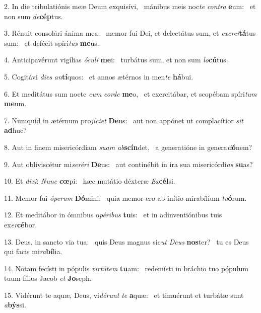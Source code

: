 2. In die tribulatiónis meæ Deum exquisívi, \dag\  mánibus meis noc\textit{te} \textit{con}\textit{tra} \textbf{e}um: \ast\  et non sum \textit{de}\textbf{cép}tus.\

3. Rénuit consolári ánima mea: \dag\  memor fui Dei, et delectátus sum, et \textit{ex}\textit{er}\textit{ci}\textbf{tá}tus sum: \ast\  et defécit spíri\textit{tus} \textbf{me}us.\

4. Anticipavérunt vigílias \textit{ó}\textit{cu}\textit{li} \textbf{me}i: \ast\  turbátus sum, et non sum \textit{lo}\textbf{cú}tus.\

5. Cogitávi \textit{di}\textit{es} \textit{an}\textbf{tí}quos: \ast\  et annos ætérnos in men\textit{te} \textbf{há}bui.\

6. Et meditátus sum nocte \textit{cum} \textit{cor}\textit{de} \textbf{me}o, \ast\  et exercitábar, et scopébam spíri\textit{tum} \textbf{me}um.\

7. Numquid in ætérnum pro\textit{jí}\textit{ci}\textit{et} \textbf{De}us: \ast\  aut non appónet ut complacítior \textit{sit} \textbf{ad}huc?\

8. Aut in finem misericórdiam \textit{su}\textit{am} \textit{ab}\textbf{scín}det, \ast\  a generatióne in genera\textit{ti}\textbf{ó}nem?\

9. Aut obliviscétur mi\textit{se}\textit{ré}\textit{ri} \textbf{De}us: \ast\  aut continébit in ira sua misericórdi\textit{as} \textbf{su}as?\

10. Et \textit{di}\textit{xi}: \textit{Nunc} \textbf{cœ}pi: \ast\  hæc mutátio déxteræ \textit{Ex}\textbf{cél}si.\

11. Memor fui \textit{ó}\textit{pe}\textit{rum} \textbf{Dó}mini: \ast\  quia memor ero ab inítio mirabílium \textit{tu}\textbf{ó}rum.\

12. Et meditábor in ómnibus o\textit{pé}\textit{ri}\textit{bus} \textbf{tu}is: \ast\  et in adinventiónibus tuis ex\textit{er}\textbf{cé}bor.\

13. Deus, in sancto via tua: \dag\  quis Deus magnus sic\textit{ut} \textit{De}\textit{us} \textbf{nos}ter? \ast\  tu es Deus qui facis mi\textit{ra}\textbf{bí}lia.\

14. Notam fecísti in pópulis \textit{vir}\textit{tú}\textit{tem} \textbf{tu}am: \ast\  redemísti in bráchio tuo pópulum tuum fílios Jacob \textit{et} \textbf{Jo}seph.\

15. Vidérunt te aquæ, Deus, vi\textit{dé}\textit{runt} \textit{te} \textbf{a}quæ: \ast\  et timuérunt et turbátæ sunt \textit{a}\textbf{býs}si.\

